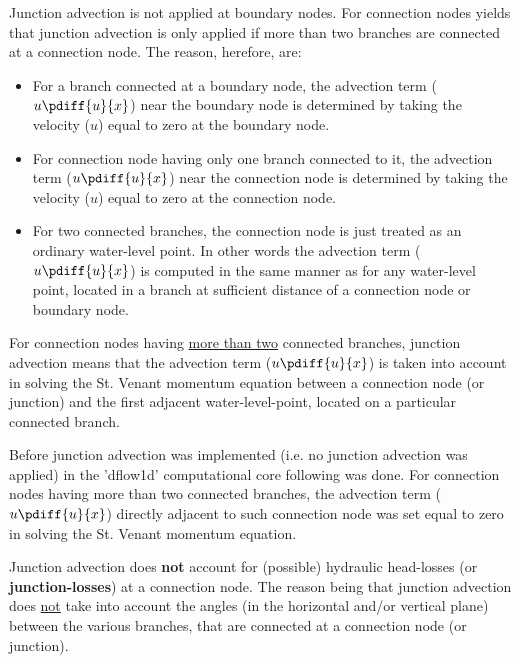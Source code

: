 Junction advection is not applied at boundary nodes. For connection nodes yields that junction advection is only applied if more than two branches are connected at a connection node. The reason, herefore, are:
\begin{itemize}
	\item For a branch connected at a boundary node, the advection term ($u \pdiff{u}{x}$) near the boundary node is determined by taking the velocity ($u$) equal to zero at the boundary node.
	\item For connection node having only one branch connected to it, the advection term ($u \pdiff{u}{x}$) near the connection node is determined by taking the velocity ($u$) equal to zero at the connection node.	
	\item For two connected branches, the connection node is just treated as an ordinary water-level point. In other words the advection term ($u \pdiff{u}{x}$) is computed in the same manner as for any water-level point, located in a branch at sufficient distance of a connection node or boundary node.
\end{itemize} 

For connection nodes having \underline{more than two} connected branches, junction advection means that the advection term ($u \pdiff{u}{x}$) is taken into account in solving the St. Venant momentum equation between a connection node (or junction) and the first adjacent water-level-point, located on a particular connected branch.

Before junction advection was implemented (i.e. no junction advection was applied) in the 'dflow1d' computational core following was done. For connection nodes having more than two connected branches, the advection term ($u \pdiff{u}{x}$) directly adjacent to such connection node was set equal to zero in solving the St. Venant momentum equation. 

\Note Junction advection does \textbf{\textcolor[rgb]{1,0,0}{not}} account for (possible) hydraulic head-losses (or \textbf{\textcolor[rgb]{1,0,0}{junction-losses}}) at a connection node. The reason being that junction advection does \underline{not} take into account the angles (in the horizontal and/or vertical plane) between the various branches, that are connected at a connection node (or junction). 

\printrefsegment
